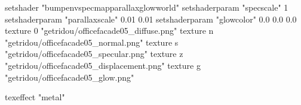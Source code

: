 setshader "bumpenvspecmapparallaxglowworld"
setshaderparam "specscale" 1
setshaderparam "parallaxscale" 0.01 0.01
setshaderparam "glowcolor" 0.0 0.0 0.0
texture 0 "getridou/officefacade05_diffuse.png"
texture n "getridou/officefacade05_normal.png"
texture s "getridou/officefacade05_specular.png"
texture z "getridou/officefacade05_displacement.png"
texture g "getridou/officefacade05_glow.png"

texeffect "metal"
